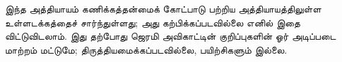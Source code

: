 \documentclass[../../../include/open-logic-chapter]{subfiles}
\begin{document}

\begin{editorial}
  இந்த அத்தியாயம் கணிக்கத்தன்மைக் கோட்பாடு பற்றிய அத்தியாயத்திலுள்ள
  உள்ளடக்கத்தைச் சார்ந்துள்ளது; அது கற்பிக்கப்படவில்லை எனில் இதை
  விட்டுவிடலாம். இது தற்போது ஜெரமி அவிகாட்டின் குறிப்புகளின் ஓர் அடிப்படை
  மாற்றம் மட்டுமே; திருத்தியமைக்கப்படவில்லை, பயிற்சிகளும் இல்லை.
\end{editorial}












\OLEndChapterHook
\end{document}
